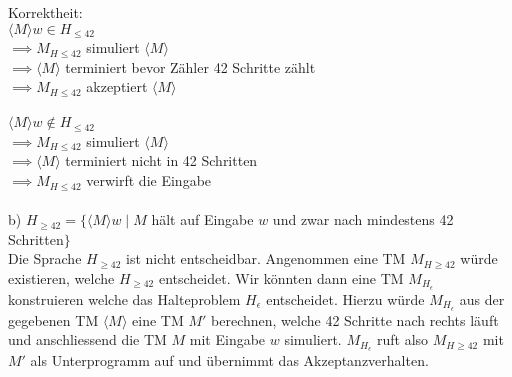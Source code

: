 Korrektheit:\\

$\langle M \rangle w \in H_{\leq42}$\\
$\implies M_{H\leq42}$ simuliert $\langle M \rangle$\\
$\implies \langle M \rangle$ terminiert bevor Zähler 42 Schritte zählt\\
$\implies M_{H\leq42}$ akzeptiert $\langle M \rangle$\\
\\

$\langle M \rangle w \not\in H_{\leq42}$\\
$\implies M_{H\leq42}$ simuliert $\langle M \rangle$\\
$\implies \langle M \rangle$ terminiert nicht in 42 Schritten\\
$\implies M_{H\leq42}$ verwirft die Eingabe\\
\\


b) $H_{\geq 42} = \{\langle M \rangle w \mid M$ hält auf Eingabe $w$ und zwar nach mindestens 42 Schritten$\}$\\

Die Sprache $H_{\geq 42}$ ist nicht entscheidbar. Angenommen eine 
TM $M_{H\geq 42}$ würde existieren, welche $H_{\geq 42}$
entscheidet. Wir könnten dann eine TM $M_{H_{\epsilon}}$
konstruieren welche das Halteproblem $H_{\epsilon}$ entscheidet.
Hierzu würde $M_{H_{\epsilon}}$ aus der gegebenen TM $\langle M 
\rangle$ eine TM 
$M'$ berechnen, welche 42 Schritte nach rechts läuft und 
anschliessend die TM $M$ mit Eingabe $w$ simuliert. 
$M_{H_{\epsilon}}$ ruft also $M_{H\geq 42}$ mit $M'$ als 
Unterprogramm auf und übernimmt das Akzeptanzverhalten.

